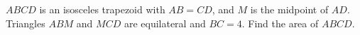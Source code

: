 $ABCD$ is an isosceles trapezoid with $AB=CD$, and $M$ is the midpoint of $AD$. Triangles $ABM$ and $MCD$ are equilateral and $BC=4$. Find the area of $ABCD$.
